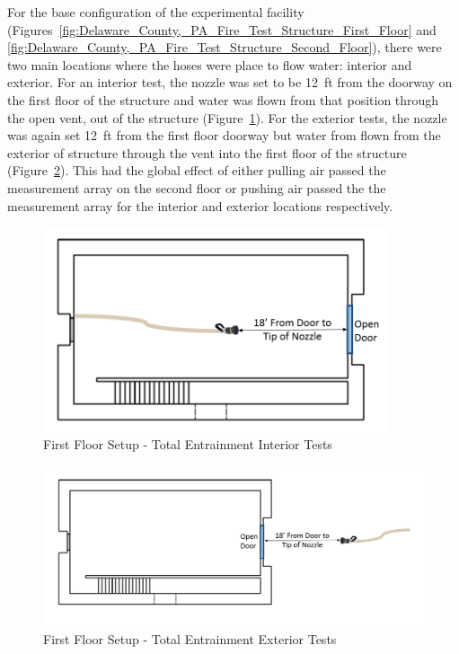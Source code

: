 \documentclass[12pt,oneside]{book}
\begin{document}
For the base configuration of the experimental facility (Figures~\ref{fig:Delaware_County,_PA_Fire_Test_Structure_First_Floor} and \ref{fig:Delaware_County,_PA_Fire_Test_Structure_Second_Floor}), there were two main locations where the hoses were place to flow water: interior and exterior. For an interior test, the nozzle was set to be 12~ft from the doorway on the first floor of the structure and water was flown from that position through the open vent, out of the structure (Figure~\ref{fig:First_Floor_Setup_Total_Entrainment_Interior_Tests}). For the exterior tests, the nozzle was again set 12~ft from the first floor doorway but water from flown from the exterior of structure through the vent into the first floor of the structure (Figure~\ref{fig:First_Floor_Setup_Total_Entrainment_Exterior_Tests}). This had the global effect of either pulling air passed the measurement array on the second floor or pushing air passed the the measurement array for the interior and exterior locations respectively.

\begin{figure}[!ht]
	\centering
	\includegraphics[width=4in]{Figures/Air_Entrainment/Measurement_Locations_Firstfloor}
	\caption{First Floor Setup - Total Entrainment Interior Tests}
	\label{fig:First_Floor_Setup_Total_Entrainment_Interior_Tests}
\end{figure}

\begin{figure}[!ht]
	\centering
	\includegraphics[width=6.5in]{Figures/Air_Entrainment/Measurement_Locations_Firstfloor_Ext}
	\caption{First Floor Setup - Total Entrainment Exterior Tests}
	\label{fig:First_Floor_Setup_Total_Entrainment_Exterior_Tests}
\end{figure}
\end{document}
